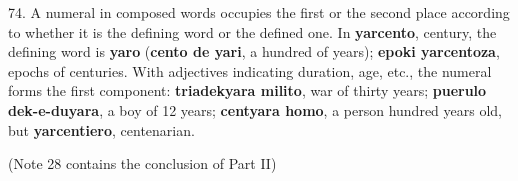 74. A numeral in composed words occupies the first or the second place according to whether it is the defining word or the defined one. In \textbf{yarcento}, century, the defining word is \textbf{yaro} (\textbf{cento de yari}, a hundred of years); \textbf{epoki yarcentoza}, epochs of centuries. With adjectives indicating duration, age, etc., the numeral forms the first component: \textbf{triadekyara milito}, war of thirty years; \textbf{puerulo dek-e-duyara}, a boy of 12 years; \textbf{centyara homo}, a person hundred years old, but \textbf{yarcentiero}, centenarian. 

(Note 28 contains the conclusion of Part II) 
